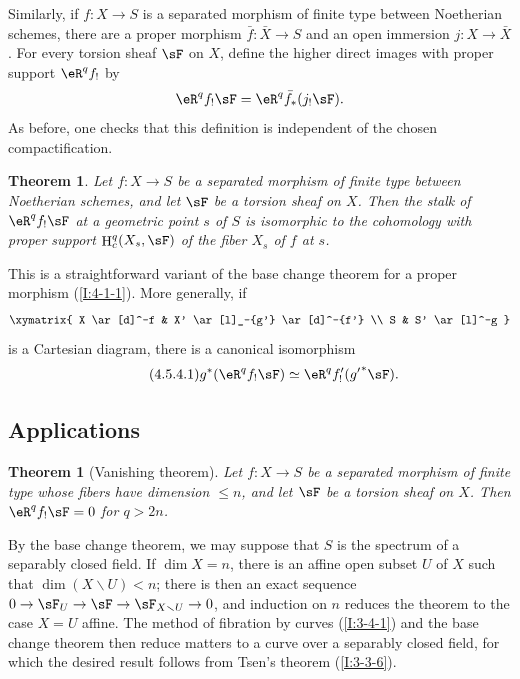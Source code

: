 \documentclass[12pt,oneside,english]{smfbook}
\DeclareMathOperator{\h}{H}
\renewcommand{\setminus}{\smallsetminus}
\newtheorem{theorem}[subsubsection]{Theorem}
\begin{document}
Similarly, if $f:X\to S$ is a separated morphism of finite type between Noetherian schemes, there are a proper morphism $\bar f:\bar X\to S$ and an open immersion $j:X\to\bar X$. For every torsion sheaf $\sF$ on $X$, define the higher direct images with proper support $\eR^qf_!$ by
\[
  \eR^q f_! \sF = \eR^q \bar f_*(j_! \sF) \text{.}
\]
As before, one checks that this definition is independent of the chosen compactification.

\begin{theorem}\label{I:4-5-4}
Let $f:X\to S$ be a separated morphism of finite type between Noetherian schemes, and let $\sF$ be a torsion sheaf on $X$. Then the stalk of $\eR^qf_!\sF$ at a geometric point $s$ of $S$ is isomorphic to the cohomology with proper support $\h_c^q(X_s,\sF)$ of the fiber $X_s$ of $f$ at $s$.
\end{theorem}

This is a straightforward variant of the base change theorem for a proper morphism (\ref{I:4-1-1}). More generally, if
\[\xymatrix{
  X \ar[d]^-f
    & X' \ar[l]_-{g'} \ar[d]^-{f'} \\
  S
    & S' \ar[l]^-g
}\]
is a Cartesian diagram, there is a canonical isomorphism
\begin{equation*}\tag{4.5.4.1}\label{I:eq:4-5-4-1}
  g^* (\eR^q f_! \sF) \simeq \eR^q f_!'({g'}^* \sF) \text{.}
\end{equation*}

\subsection{Applications}\label{I:4-6}

\begin{theorem}[Vanishing theorem]\label{I:4-6-1}
Let $f:X\to S$ be a separated morphism of finite type whose fibers have dimension $\leqslant n$, and let $\sF$ be a torsion sheaf on $X$. Then $\eR^qf_!\sF=0$ for $q>2n$.
\end{theorem}

By the base change theorem, we may suppose that $S$ is the spectrum of a separably closed field. If $\dim X=n$, there is an affine open subset $U$ of $X$ such that $\dim(X\setminus U)<n$; there is then an exact sequence $0\to\sF_U\to\sF\to\sF_{X\setminus U}\to0$, and induction on $n$ reduces the theorem to the case $X=U$ affine. The method of fibration by curves (\ref{I:3-4-1}) and the base change theorem then reduce matters to a curve over a separably closed field, for which the desired result follows from Tsen's theorem (\ref{I:3-3-6}).
\end{document}
